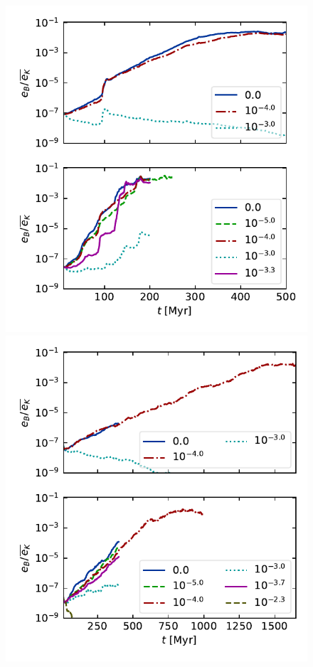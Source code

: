 \documentclass[preprint2]{aastex63}
\begin{document}
\begin{figure}
  \includegraphics[trim=0.5cm 0.0cm 0.3cm 0.0cm, clip=true,width=\columnwidth]{figs/2pc-eB-nu5.pdf}
  \includegraphics[trim=0.5cm 0.0cm 0.3cm 0.0cm, clip=true,width=\columnwidth]{figs/4pc-eB-nu6.pdf}

\end{figure}
\end{document}
